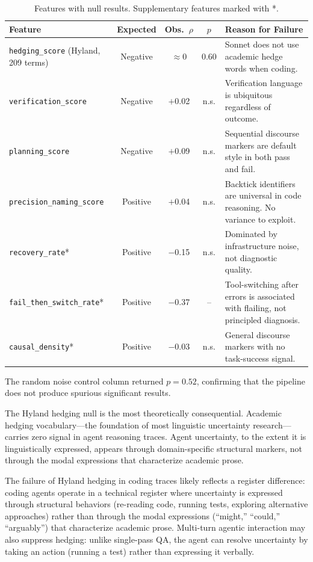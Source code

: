 \documentclass[11pt]{article}
\newcommand{\feat}[1]{\texttt{#1}}
\begin{document}
\begin{table}[t]
\centering
\caption{Features with null results. Supplementary features marked with *.}
\label{tab:null}
\small
\begin{tabular}{lcccp{4.5cm}}
\toprule
\textbf{Feature} & \textbf{Expected} & \textbf{Obs.\ $\rho$} & $p$ & \textbf{Reason for Failure} \\
\midrule
\feat{hedging\_score} (Hyland, 209 terms) & Negative & $\approx 0$ & 0.60 & Sonnet does not use academic hedge words when coding. \\
\feat{verification\_score}   & Negative & $+$0.02 & n.s. & Verification language is ubiquitous regardless of outcome. \\
\feat{planning\_score}       & Negative & $+$0.09 & n.s. & Sequential discourse markers are default style in both pass and fail. \\
\feat{precision\_naming\_score} & Positive & $+$0.04 & n.s. & Backtick identifiers are universal in code reasoning. No variance to exploit. \\
\feat{recovery\_rate}*       & Positive & $-$0.15 & n.s. & Dominated by infrastructure noise, not diagnostic quality. \\
\feat{fail\_then\_switch\_rate}* & Positive & $-$0.37 & -- & Tool-switching after errors is associated with flailing, not principled diagnosis. \\
\feat{causal\_density}*      & Positive & $-$0.03 & n.s. & General discourse markers with no task-success signal. \\
\bottomrule
\end{tabular}
\end{table}

The random noise control column returned $p = 0.52$, confirming that the pipeline does not produce spurious significant results.

The Hyland hedging null is the most theoretically consequential.
Academic hedging vocabulary---the foundation of most linguistic uncertainty research---carries zero signal in agent reasoning traces.
Agent uncertainty, to the extent it is linguistically expressed, appears through domain-specific structural markers, not through the modal expressions that characterize academic prose.

The failure of Hyland hedging in coding traces likely reflects a register difference: coding agents operate in a technical register where uncertainty is expressed through structural behaviors (re-reading code, running tests, exploring alternative approaches) rather than through the modal expressions (``might,'' ``could,'' ``arguably'') that characterize academic prose.
Multi-turn agentic interaction may also suppress hedging: unlike single-pass QA, the agent can resolve uncertainty by taking an action (running a test) rather than expressing it verbally.
\end{document}
